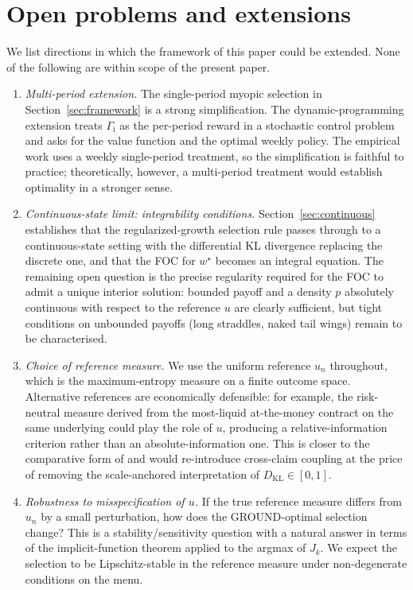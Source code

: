 \documentclass[11pt]{article}
\theoremstyle{definition}
\theoremstyle{remark}
\newcommand{\KL}{D_{\mathrm{KL}}}
\newcommand{\GROUND}{\Gamma_{\mathrm{i}}}
\begin{document}
\section{Open problems and extensions}\label{sec:open}

We list directions in which the framework of this paper could be
extended. None of the following are within scope of the present paper.

\begin{enumerate}
    \item \emph{Multi-period extension.}
        The single-period myopic selection in Section~\ref{sec:framework}
        is a strong simplification. The dynamic-programming extension
        treats $\GROUND$ as the per-period reward in a stochastic
        control problem and asks for the value function and the
        optimal weekly policy. The empirical work uses a weekly
        single-period treatment, so the simplification is faithful to
        practice; theoretically, however, a multi-period treatment
        would establish optimality in a stronger sense.
    \item \emph{Continuous-state limit: integrability conditions.}
        Section~\ref{sec:continuous} establishes that the
        regularized-growth selection rule passes through to a
        continuous-state setting with the differential KL divergence
        replacing the discrete one, and that the FOC for $w^\star$
        becomes an integral equation. The remaining open question is
        the precise regularity required for the FOC to admit a unique
        interior solution: bounded payoff and a density $p$ absolutely
        continuous with respect to the reference $u$ are clearly
        sufficient, but tight conditions on unbounded payoffs (long
        straddles, naked tail wings) remain to be characterised.
    \item \emph{Choice of reference measure.}
        We use the uniform reference $u_n$ throughout, which is the
        maximum-entropy measure on a finite outcome space. Alternative
        references are economically defensible: for example, the
        risk-neutral measure derived from the most-liquid at-the-money
        contract on the same underlying could play the role of $u$,
        producing a relative-information criterion rather than an
        absolute-information one. This is closer to the comparative
        form of \citet{mercurio2020} and would re-introduce
        cross-claim coupling at the price of removing the
        scale-anchored interpretation of $\KL \in [0, 1]$.
    \item \emph{Robustness to misspecification of $u$.}
        If the true reference measure differs from $u_n$ by a
        small perturbation, how does the GROUND-optimal selection
        change? This is a stability/sensitivity question with a
        natural answer in terms of the implicit-function theorem
        applied to the argmax of $J_k$. We expect the selection to be
        Lipschitz-stable in the reference measure under
        non-degenerate conditions on the menu.
\end{enumerate}
\end{document}
